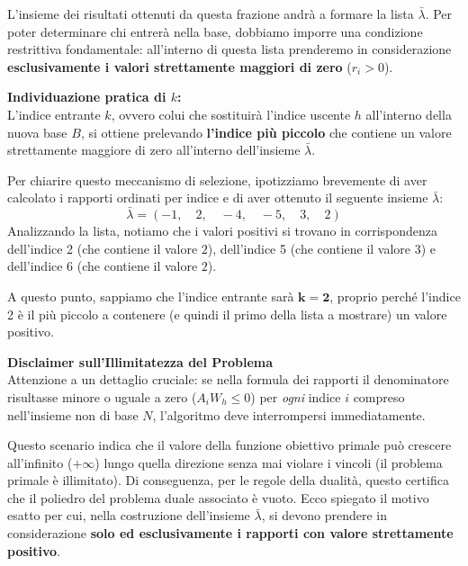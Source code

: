 \documentclass[12pt, a4paper]{article}
\begin{document}
	L'insieme dei risultati ottenuti da questa frazione andrà a formare la lista $\bar{\lambda}$. Per poter determinare chi entrerà nella base, dobbiamo imporre una condizione restrittiva fondamentale: all'interno di questa lista prenderemo in considerazione \textbf{esclusivamente i valori strettamente maggiori di zero} ($r_i > 0$).
	
	\vspace{0.4cm}
	\textbf{Individuazione pratica di $k$:}\\
	L'indice entrante $k$, ovvero colui che sostituirà l'indice uscente $h$ all'interno della nuova base $B$, si ottiene prelevando \textbf{l'indice più piccolo} che contiene un valore strettamente maggiore di zero all'interno dell'insieme $\bar{\lambda}$.
	
	Per chiarire questo meccanismo di selezione, ipotizziamo brevemente di aver calcolato i rapporti ordinati per indice e di aver ottenuto il seguente insieme $\bar{\lambda}$:
	\[
	\bar{\lambda} = (-1, \quad 2, \quad -4, \quad -5, \quad 3, \quad 2)
	\]
	Analizzando la lista, notiamo che i valori positivi si trovano in corrispondenza dell'indice 2 (che contiene il valore $2$), dell'indice 5 (che contiene il valore $3$) e dell'indice 6 (che contiene il valore $2$). 
	
	A questo punto, sappiamo che l'indice entrante sarà $\mathbf{k = 2}$, proprio perché l'indice 2 è il più piccolo a contenere (e quindi il primo della lista a mostrare) un valore positivo.
	
	\vspace{0.4cm}
	\textbf{Disclaimer sull'Illimitatezza del Problema}\\
	Attenzione a un dettaglio cruciale: se nella formula dei rapporti il denominatore risultasse minore o uguale a zero ($A_i W_h \leq 0$) per \textit{ogni} indice $i$ compreso nell'insieme non di base $N$, l'algoritmo deve interrompersi immediatamente. 
	
	Questo scenario indica che il valore della funzione obiettivo primale può crescere all'infinito ($+\infty$) lungo quella direzione senza mai violare i vincoli (il problema primale è illimitato). Di conseguenza, per le regole della dualità, questo certifica che il poliedro del problema duale associato è vuoto. 
	Ecco spiegato il motivo esatto per cui, nella costruzione dell'insieme $\bar{\lambda}$, si devono prendere in considerazione \textbf{solo ed esclusivamente i rapporti con valore strettamente positivo}.
	
\end{document}
